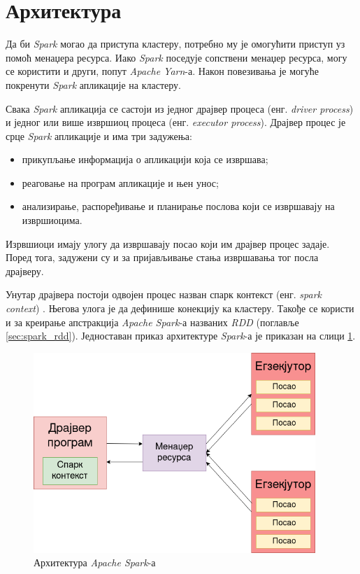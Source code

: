 \documentclass[12pt,oneside]{memoir}
\begin{document}
\section{Архитектура}
\label{sec:spark_arx}

Да би \textit{Spark} могао да приступа кластеру, потребно му је омогућити приступ уз помоћ менаџера ресурса. Иако \textit{Spark} поседује сопствени менаџер ресурса, могу се користити и други, попут \textit{Apache Yarn}-а. Након повезивања је могуће покренути \textit{Spark} апликације на кластеру. 

Свака \textit{Spark} апликација се састоји из једног драјвер процеса (енг. \textit{driver process}) и једног или више извршиоц процеса (енг. \textit{executor process}). Драјвер процес је срце \textit{Spark} апликације и има три задужења:

\begin{itemize}
	\item прикупљање информација о апликацији која се извршава;
	\item реаговање на програм апликације и њен унос;
	\item анализирање, распоређивање и планирање послова који се извршавају на извршиоцима.
\end{itemize}

Изрвшиоци имају улогу да извршавају посао који им драјвер процес задаје. Поред тога, задужени су и за пријављивање стања извршавања тог посла драјверу. 

Унутар драјвера постоји одвојен процес назван спарк контекст (енг. \textit{spark context}) \cite{spark_guide}. Његова улога је да дефинише конекцију ка кластеру. Такође се користи и за креирање апстракција \textit{Apache Spark}-а названих \textit{RDD} (поглавље \ref{sec:spark_rdd}). Једноставан приказ архитектуре \textit{Spark}-а је приказан на слици \ref{fig:spark_arhtt}.

\begin{figure}[!ht]
  \centering
  \includegraphics[width=0.95\textwidth]{pictures/spark_arch.png}
  \caption{Архитектура \textit{Apache Spark}-а}
  \label{fig:spark_arhtt}
\end{figure}
\end{document}
